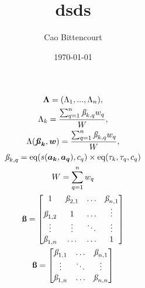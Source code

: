\documentclass{article}
\title{
    dsds
}
\author{Cao Bittencourt}
\date{\today}
\begin{document}
\maketitle

\begin{gather}
    \boldsymbol{\Lambda} = (\Lambda_{1}, ..., \Lambda_{n}),\\
    \Lambda_{k} = 
        \frac{
            \sum_{q=1}^{n}{
                \textit{\ss}_{k,q}
                w_q
            }
        }{
            W
        },\\
    \Lambda(\boldsymbol{\textbf{\textit{\ss}}_{k}}, \boldsymbol{w}) = 
        \frac{
            \sum_{q=1}^{n}{
                \textit{\ss}_{k,q}
                w_q
            }
        }{
            W
        },\\
    \textit{\ss}_{k,q} = 
        \text{eq}(s(\boldsymbol{a_k},\boldsymbol{a_q}), c_q)
        \times
        \text{eq}(\tau_k, \tau_q, c_q)\\
    W = 
        \sum_{q=1}^{n}{
            w_q
        }\\
    \textbf{\ss} = 
    \begin{bmatrix}
        1 & \textit{\ss}_{2,1} & \hdots & \textit{\ss}_{n,1}\\
        \textit{\ss}_{1,2} & 1 & \hdots & \vdots\\
        \vdots & \vdots & \ddots & \vdots\\
        \textit{\ss}_{1,n} & \hdots & \hdots & 1\\
    \end{bmatrix}\\
    \textbf{\ss} = 
    \begin{bmatrix}
        \textit{\ss}_{1,1} & \hdots & \textit{\ss}_{n,1}\\
        \vdots & \ddots & \vdots\\
        \textit{\ss}_{1,n} & \hdots & \textit{\ss}_{n,n}\\
    \end{bmatrix}\\

\end{gather}
\end{document}
